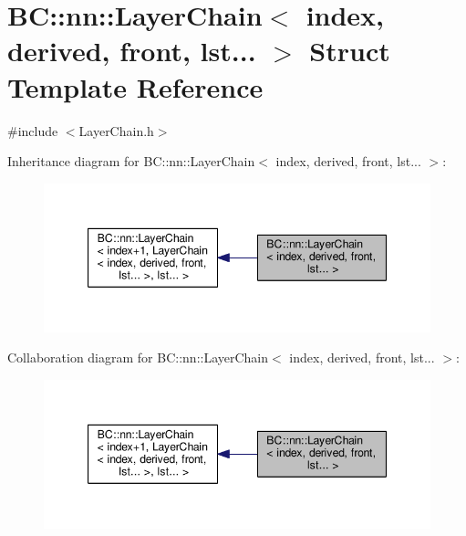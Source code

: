\hypertarget{structBC_1_1nn_1_1LayerChain_3_01index_00_01derived_00_01front_00_01lst_8_8_8_01_4}{}\section{BC\+:\+:nn\+:\+:Layer\+Chain$<$ index, derived, front, lst... $>$ Struct Template Reference}
\label{structBC_1_1nn_1_1LayerChain_3_01index_00_01derived_00_01front_00_01lst_8_8_8_01_4}


{\ttfamily \#include $<$Layer\+Chain.\+h$>$}



Inheritance diagram for BC\+:\+:nn\+:\+:Layer\+Chain$<$ index, derived, front, lst... $>$\+:
\nopagebreak
\begin{figure}[H]
\begin{center}
\leavevmode
\includegraphics[width=347pt]{structBC_1_1nn_1_1LayerChain_3_01index_00_01derived_00_01front_00_01lst_8_8_8_01_4__inherit__graph}
\end{center}
\end{figure}


Collaboration diagram for BC\+:\+:nn\+:\+:Layer\+Chain$<$ index, derived, front, lst... $>$\+:
\nopagebreak
\begin{figure}[H]
\begin{center}
\leavevmode
\includegraphics[width=347pt]{structBC_1_1nn_1_1LayerChain_3_01index_00_01derived_00_01front_00_01lst_8_8_8_01_4__coll__graph}
\end{center}
\end{figure}
